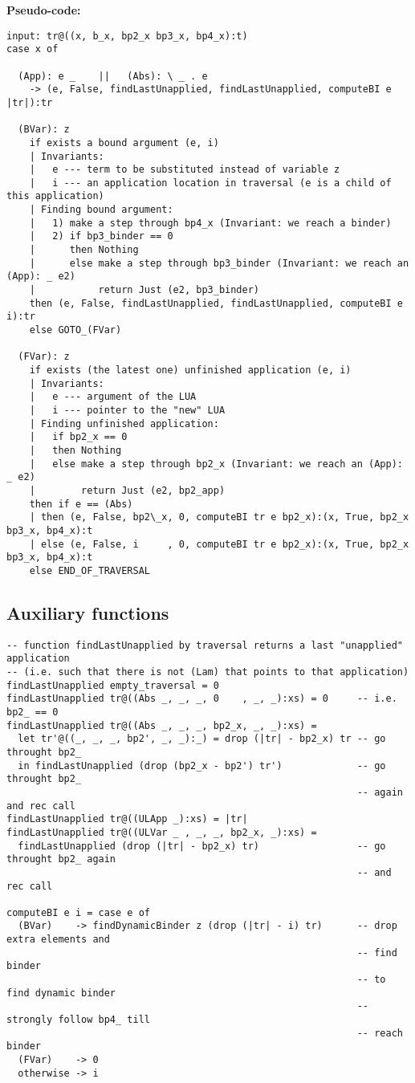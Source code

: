 \documentclass[a4paper, 10pt]{article}
\begin{document}
\textbf{Pseudo-code:}
\begin{verbatim}
input: tr@((x, b_x, bp2_x bp3_x, bp4_x):t)
case x of
  
  (App): e _    ||   (Abs): \ _ . e
    -> (e, False, findLastUnapplied, findLastUnapplied, computeBI e |tr|):tr

  (BVar): z
    if exists a bound argument (e, i)
    | Invariants:
    |   e --- term to be substituted instead of variable z
    |   i --- an application location in traversal (e is a child of this application)
    | Finding bound argument:
    |   1) make a step through bp4_x (Invariant: we reach a binder)
    |   2) if bp3_binder == 0
    |      then Nothing
    |      else make a step through bp3_binder (Invariant: we reach an (App): _ e2)
    |           return Just (e2, bp3_binder)
    then (e, False, findLastUnapplied, findLastUnapplied, computeBI e i):tr
    else GOTO_(FVar)

  (FVar): z
    if exists (the latest one) unfinished application (e, i)
    | Invariants:
    |   e --- argument of the LUA
    |   i --- pointer to the "new" LUA
    | Finding unfinished application:
    |   if bp2_x == 0
    |   then Nothing
    |   else make a step through bp2_x (Invariant: we reach an (App): _ e2)
    |        return Just (e2, bp2_app)
    then if e == (Abs)
    | then (e, False, bp2\_x, 0, computeBI tr e bp2_x):(x, True, bp2_x bp3_x, bp4_x):t
    | else (e, False, i     , 0, computeBI tr e bp2_x):(x, True, bp2_x bp3_x, bp4_x):t
    else END_OF_TRAVERSAL
\end{verbatim}

\subsection*{Auxiliary functions}
\begin{verbatim}
-- function findLastUnapplied by traversal returns a last "unapplied" application
-- (i.e. such that there is not (Lam) that points to that application)
findLastUnapplied empty_traversal = 0
findLastUnapplied tr@((Abs _, _, _, 0    , _, _):xs) = 0     -- i.e. bp2_ == 0
findLastUnapplied tr@((Abs _, _, _, bp2_x, _, _):xs) =
  let tr'@((_, _, _, bp2', _, _):_) = drop (|tr| - bp2_x) tr -- go throught bp2_
  in findLastUnapplied (drop (bp2_x - bp2') tr')             -- go throught bp2_ 
                                                             -- again and rec call
findLastUnapplied tr@((ULApp _):xs) = |tr|
findLastUnapplied tr@((ULVar _ , _, _, bp2_x, _):xs) =
  findLastUnapplied (drop (|tr| - bp2_x) tr)                 -- go throught bp2_ again
                                                             -- and rec call

computeBI e i = case e of
  (BVar)    -> findDynamicBinder z (drop (|tr| - i) tr)      -- drop extra elements and
                                                             -- find binder
                                                             -- to find dynamic binder
                                                             -- strongly follow bp4_ till
                                                             -- reach binder
  (FVar)    -> 0
  otherwise -> i
\end{verbatim}
\end{document}
